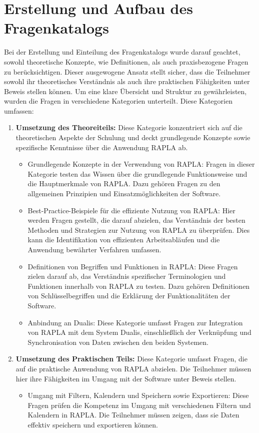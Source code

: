 \section{Erstellung und Aufbau des Fragenkatalogs}
Bei der Erstellung und Einteilung des Fragenkatalogs wurde darauf geachtet, sowohl theoretische Konzepte, wie Definitionen, als auch praxisbezogene Fragen zu berücksichtigen. Dieser ausgewogene Ansatz stellt sicher, dass die Teilnehmer sowohl ihr theoretisches Verständnis als auch ihre praktischen Fähigkeiten unter Beweis stellen können. Um eine klare Übersicht und Struktur zu gewährleisten, wurden die Fragen in verschiedene Kategorien unterteilt. Diese Kategorien umfassen:
\begin{enumerate}
    \item \textbf{Umsetzung des Theoreiteils:}
    Diese Kategorie konzentriert sich auf die theoretischen Aspekte der Schulung und deckt grundlegende Konzepte sowie spezifische Kenntnisse über die Anwendung RAPLA ab.
    \begin{itemize}
        \item Grundlegende Konzepte in der Verwendung von RAPLA: Fragen in dieser Kategorie testen das Wissen über die grundlegende Funktionsweise und die Hauptmerkmale von RAPLA. Dazu gehören Fragen zu den allgemeinen Prinzipien und Einsatzmöglichkeiten der Software.

        \item Best-Practice-Beispiele für die effiziente Nutzung von RAPLA: Hier werden Fragen gestellt, die darauf abzielen, das Verständnis der besten Methoden und Strategien zur Nutzung von RAPLA zu überprüfen. Dies kann die Identifikation von effizienten Arbeitsabläufen und die Anwendung bewährter Verfahren umfassen.

        \item Definitionen von Begriffen und Funktionen in RAPLA: Diese Fragen zielen darauf ab, das Verständnis spezifischer Terminologien und Funktionen innerhalb von RAPLA zu testen. Dazu gehören Definitionen von Schlüsselbegriffen und die Erklärung der Funktionalitäten der Software.

        \item Anbindung an Dualis: Diese Kategorie umfasst Fragen zur Integration von RAPLA mit dem System Dualis, einschließlich der Verknüpfung und Synchronisation von Daten zwischen den beiden Systemen.
    \end{itemize}
    \item \textbf{Umsetzung des Praktischen Teils:}
    Diese Kategorie umfasst Fragen, die auf die praktische Anwendung von RAPLA abzielen. Die Teilnehmer müssen hier ihre Fähigkeiten im Umgang mit der Software unter Beweis stellen.
    \begin{itemize}
        \item Umgang mit Filtern, Kalendern und Speichern sowie Exportieren: Diese Fragen prüfen die Kompetenz im Umgang mit verschiedenen Filtern und Kalendern in RAPLA. Die Teilnehmer müssen zeigen, dass sie Daten effektiv speichern und exportieren können.


\end{itemize}
\end{enumerate}
